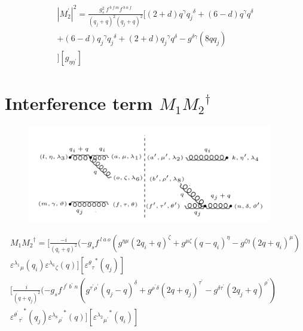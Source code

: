 \begin{equation}
\begin{split}
{|{M}^{\prime}_2|}^2 =\frac{g_s^2\: f^{\:b\:f\:m} f^{\:b\:n\:f}}{(q_j +q)^2 (q_j +q)^2}[(2+d)q^{\gamma}{q_j}^{\delta}+(6-d)q^{\gamma}{q}^{\delta}\\+(6-d){q_j}^{\gamma}{q_j}^{\delta}+(2+d){q_j}^{\gamma}{q}^{\delta}-g^{{\delta}{\gamma}}(8qq_j)\\
][g_{{\eta}{{\eta}^{\prime}}}]
\end{split}
\end{equation}

\section{Interference term $M_1 {M_2}^{\dagger}$}
\begin{figure}[h!]
\centering
\includegraphics[width=0.95\textwidth]{images/GG/M1M2Dagger.png}
\end{figure}

\begin{equation}
\begin{split}
M_1{M_2}^{\dagger}=[\frac{-i}{(q_i +q)^2}(-g_s f^{\:l\:a\:o}(g^{{\eta}{\mu}}(2q_i+q)^{\zeta}+g^{{\mu}{\zeta}}(q -q_i)^{\eta}-g^{{\zeta}{\eta}}(2q +q_i)^{\mu})\\
{\varepsilon^{\lambda_1}}_{\mu} (q_i) {\varepsilon^{\lambda_6}}_{\zeta}(q)][{{\varepsilon^{\theta}}_{{\tau}}}^* (q_j)]\\
[\frac{i}{(q +q_j)^2}(-g_s f^{\:f^{\prime}\:b^{\prime}\:n }(g^{{{\tau}^{\prime}}{{\rho}^{\prime}}}(q_j-q)^{{\delta}}+g^{{{\rho}^{\prime}}{{\delta}}}(2q +q_j)^{{\tau}^{\prime}}-g^{{{\delta}}{{\tau}^{\prime}}}(2q_j+q)^{{\rho}^{\prime}})\\
{{\varepsilon^{{\theta}^{\prime}}}_{{\tau}^{\prime}}}^* (q_j){{\varepsilon^{\lambda_8}}_{{\rho}^{\prime}}}^* (q)][{{\varepsilon^{\lambda_2}}_{{\mu}^{\prime}}}^* (q_i)]
\end{split}
\end{equation}


